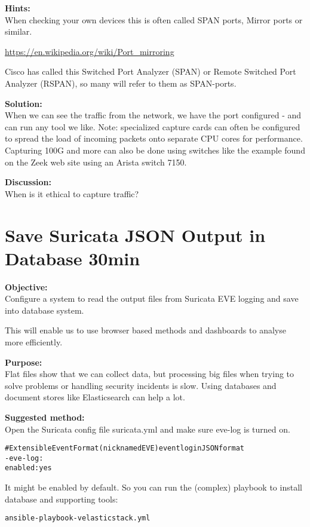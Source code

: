 \documentclass[a4paper,11pt,notitlepage]{report}
\begin{document}
{\bf Hints:}\\
When checking your own devices this is often called SPAN ports, Mirror ports or similar.

\url{https://en.wikipedia.org/wiki/Port_mirroring}

Cisco has called this Switched Port Analyzer (SPAN) or Remote Switched Port Analyzer (RSPAN), so many will refer to them as SPAN-ports.

{\bf Solution:}\\
When we can see the traffic from the network, we have the port configured - and can run any tool we like. Note: specialized capture cards can often be configured to spread the load of incoming packets onto separate CPU cores for performance. Capturing 100G and more can also be done using switches like the example found on the Zeek web site using an Arista switch 7150.


{\bf Discussion:}\\
When is it ethical to capture traffic?


\chapter{Save Suricata JSON Output in Database 30min}
\label{ex:suricatahasboards}


{\bf Objective:} \\
Configure a system to read the output files from Suricata EVE logging and save into database system.

This will enable us to use browser based methods and dashboards to analyse more efficiently.


{\bf Purpose:}\\
Flat files show that we can collect data, but processing big files when trying to solve problems or handling security incidents is slow. Using databases and document stores like Elasticsearch can help a lot.


{\bf Suggested method:}\\
Open the Suricata config file suricata.yml and make sure eve-log is turned on.
\begin{alltt}
# Extensible Event Format (nicknamed EVE) event log in JSON format
- eve-log:
    enabled: yes
\end{alltt}

It might be enabled by default. So you can run the (complex) playbook to install database and supporting tools:
\begin{alltt}
ansible-playbook -v elasticstack.yml
\end{alltt}
\end{document}
